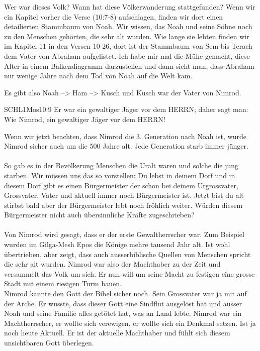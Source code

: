 \documentclass[14pt]{../../inc/mybib}
\begin{document}
    Wer war dieses Volk? Wann hat diese Völkerwanderung stattgefunden? Wenn wir ein Kapitel vorher die Verse   (10:7-8) aufschlagen, finden wir dort einen detailierten Stammbaum von Noah. Wir wissen, das Noah und seine Söhne noch zu den Menschen gehörten, die sehr alt wurden. Wie lange sie lebten finden wir im Kapitel 11 in den Versen 10-26, dort ist der Stammbaum von Sem bis Terach dem Vater von Abraham aufgelistet. Ich habe mir mal die Mühe gemacht, diese Alter in einem Balkendiagramm darzustellen und dann sieht man, dass Abraham nur wenige Jahre nach dem Tod von Noah auf die Welt kam. 

    
    
    Es gibt also Noah --> Ham --> Kusch und Kusch war der Vater von Nimrod.
    \begin{bibelbox}{SCHL}{1Mos}{10:9}
        Er war ein gewaltiger Jäger vor dem HERRN; daher sagt man: Wie Nimrod, ein gewaltiger Jäger vor dem HERRN!
    \end{bibelbox}
    Wenn wir jetzt beachten, dass Nimrod die 3. Generation nach Noah ist, wurde Nimrod sicher auch um die 500 Jahre alt. Jede Generation starb immer jünger. 
    \\
    \\
    So gab es in der Bevölkerung Menschen die Uralt waren und solche die jung starben. Wir müssen uns das so vorstellen:  Du lebst in deinem Dorf und in diesem Dorf gibt es einen Bürgermeister der schon bei deinem Urgrossvater, Grossvater, Vater und aktuell immer noch Bürgermeister ist. Jetzt bist du alt stirbst bald aber der Bürgermeister lebt noch fröhlich weiter. Würden diesem Bürgermeister nicht auch übersinnliche Kräfte zugeschrieben? 
    \\
    \\
    Von Nimrod wird gesagt, dass er der erste Gewaltherrscher war. Zum Beispiel wurden im Gilga-Mesh Epos die Könige mehre tausend Jahr alt. Ist wohl übertrieben, aber zeigt, dass auch ausserbiblische Quellen von Menschen spricht die sehr alt wurden. Nimrod war also der Machthaber zu der Zeit und versammelt das Volk um sich. Er nun will um seine Macht zu festigen eine grosse Stadt mit einem riesigen Turm bauen.
    \\
    
    Nimrod kannte den Gott der Bibel sicher noch. Sein Grossvater war ja mit auf der Arche. Er wusste, dass dieser Gott eine Sindflut ausgelöst hat und ausser Noah und seine Familie alles getötet hat, was an Land lebte. Nimrod war ein Machtherrscher, er wollte sich verewigen, er wollte sich ein Denkmal setzen. Ist ja noch heute Aktuell. Er ist der aktuelle Machthaber und fühlt sich diesem unsichtbaren Gott überlegen.
    \\
    
\end{document}
